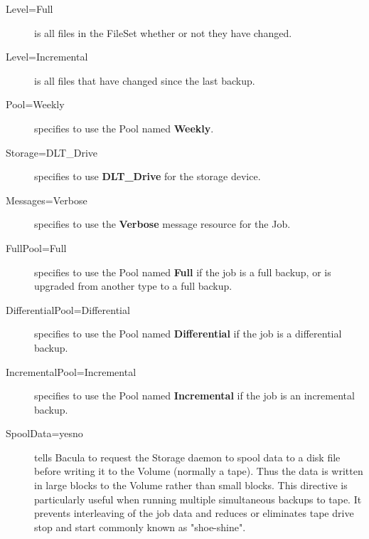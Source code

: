 \begin{description}
\begin{description}

\item [Level=Full]
   is all files in the FileSet whether or not  they have changed.  

\item [Level=Incremental]
   is all files that have changed since  the last backup.  

\item [Pool=Weekly]
   specifies to use the Pool named {\bf Weekly}.  

\item [Storage=DLT\_Drive]
   specifies to use {\bf DLT\_Drive} for  the storage device.  

\item [Messages=Verbose]
   specifies to use the {\bf Verbose}  message resource for the Job.  

\item [FullPool=Full]
   specifies to use the Pool named {\bf Full}  if the job is a full backup, or
is
upgraded from another type  to a full backup.  

\item [DifferentialPool=Differential]
   specifies to use the Pool named {\bf Differential} if the job is a
   differential  backup.  

\item [IncrementalPool=Incremental]
   specifies to use the Pool  named {\bf Incremental} if the job is an
incremental  backup.  

\item [SpoolData=yes\vb{}no]
   tells Bacula to request the Storage  daemon to spool data to a disk file
   before writing it to the Volume (normally a tape). Thus the data is
   written in large blocks to the Volume rather than small blocks. This
   directive is particularly useful when running multiple simultaneous
   backups to tape. It prevents interleaving of the job data and reduces
   or eliminates tape drive stop and start commonly known as "shoe-shine".


\end{description}
\end{description}
